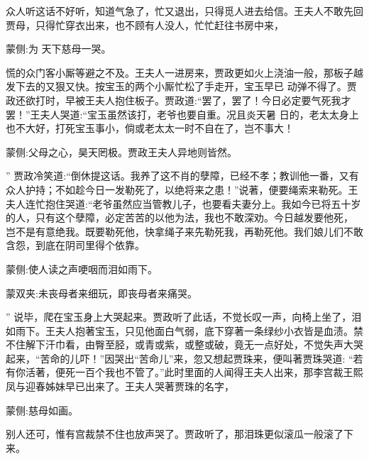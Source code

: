 \begin{parag}
    众人听这话不好听，知道气急了，忙又退出，只得觅人进去给信。王夫人不敢先回贾母，只得忙穿衣出来，也不顾有人没人，忙忙赶往书房中来，\begin{note}蒙侧:为 天下慈母一哭。\end{note}慌的众门客小厮等避之不及。王夫人一进房来，贾政更如火上浇油一般，那板子越发下去的又狠又快。按宝玉的两个小厮忙松了手走开，宝玉早已 动弹不得了。贾政还欲打时，早被王夫人抱住板子。贾政道:“罢了，罢了！今日必定要气死我才罢！”王夫人哭道:“宝玉虽然该打，老爷也要自重。况且炎天暑 日的，老太太身上也不大好，打死宝玉事小，倘或老太太一时不自在了，岂不事大！\begin{note}蒙侧:父母之心，昊天罔极。贾政王夫人异地则皆然。\end{note}” 贾政冷笑道:“倒休提这话。我养了这不肖的孽障，已经不孝；教训他一番，又有众人护持；不如趁今日一发勒死了，以绝将来之患！”说著，便要绳索来勒死。王夫人连忙抱住哭道:“老爷虽然应当管教儿子，也要看夫妻分上。我如今已将五十岁的人，只有这个孽障，必定苦苦的以他为法，我也不敢深劝。今日越发要他死， 岂不是有意绝我。既要勒死他，快拿绳子来先勒死我，再勒死他。我们娘儿们不敢含怨，到底在阴司里得个依靠。\begin{note}蒙侧:使人读之声哽咽而泪如雨下。\end{note}\begin{note}蒙双夹:未丧母者来细玩，即丧母者来痛哭。\end{note}” 说毕，爬在宝玉身上大哭起来。贾政听了此话，不觉长叹一声，向椅上坐了，泪如雨下。王夫人抱著宝玉，只见他面白气弱，底下穿著一条绿纱小衣皆是血渍。禁不住解下汗巾看，由臀至胫，或青或紫，或整或破，竟无一点好处，不觉失声大哭起来，“苦命的儿吓！”因哭出“苦命儿”来，忽又想起贾珠来，便叫著贾珠哭道: “若有你活著，便死一百个我也不管了。”此时里面的人闻得王夫人出来，那李宫裁王熙凤与迎春姊妹早已出来了。王夫人哭著贾珠的名字，\begin{note}蒙侧:慈母如画。\end{note}别人还可，惟有宫裁禁不住也放声哭了。贾政听了，那泪珠更似滚瓜一般滚了下来。
\end{parag}



